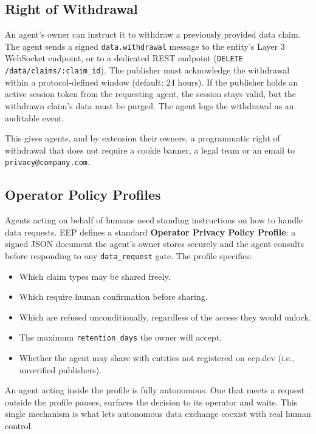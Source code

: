 \documentclass[12pt,a4paper]{article}
\begin{document}
\subsection{Right of Withdrawal}

An agent's owner can instruct it to withdraw a previously provided data claim. The agent sends a signed \texttt{data.withdrawal} message to the entity's Layer 3 WebSocket endpoint, or to a dedicated REST endpoint (\texttt{DELETE /data/claims/:claim\_id}). The publisher must acknowledge the withdrawal within a protocol-defined window (default: 24 hours). If the publisher holds an active session token from the requesting agent, the session stays valid, but the withdrawn claim's data must be purged. The agent logs the withdrawal as an auditable event.

This gives agents, and by extension their owners, a programmatic right of withdrawal that does not require a cookie banner, a legal team or an email to \texttt{privacy@company.com}.

\subsection{Operator Policy Profiles}

Agents acting on behalf of humans need standing instructions on how to handle data requests. EEP defines a standard \textbf{Operator Privacy Policy Profile}: a signed JSON document the agent's owner stores securely and the agent consults before responding to any \texttt{data\_request} gate. The profile specifies:

\begin{itemize}
    \item Which claim types may be shared freely.
    \item Which require human confirmation before sharing.
    \item Which are refused unconditionally, regardless of the access they would unlock.
    \item The maximum \texttt{retention\_days} the owner will accept.
    \item Whether the agent may share with entities not registered on eep.dev (i.e., unverified publishers).
\end{itemize}

An agent acting inside the profile is fully autonomous. One that meets a request outside the profile pauses, surfaces the decision to its operator and waits. This single mechanism is what lets autonomous data exchange coexist with real human control.
\end{document}
